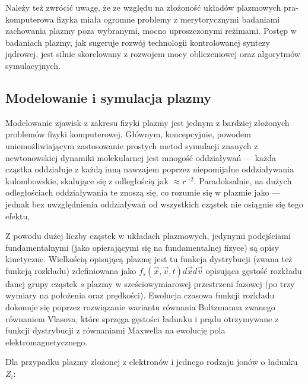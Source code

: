     Należy też zwrócić uwagę, że ze względu na złożoność układów plazmowych
    pra-komputerowa fizyka miała ogromne problemy z merytorycznymi badaniami
    zachowania plazmy poza wybranymi, mocno uproszczonymi reżimami. Postęp w
    badaniach plazmy, jak sugeruje rozwój technologii kontrolowanej syntezy
    jądrowej, jest silnie skorelowany z
    rozwojem mocy obliczeniowej oraz algorytmów symulacyjnych.\cite{youtube-plasma-algorithm-progress}

    \subsection{Modelowanie i symulacja plazmy}

    Modelowanie zjawisk z zakresu fizyki plazmy jest jednym z bardziej
    złożonych problemów fizyki komputerowej. Głównym, koncepcyjnie, powodem
    uniemożliwiającym zastosowanie prostych metod symulacji znanych z
    newtonowskiej dynamiki molekularnej jest mnogość oddziaływań --- każda
    cząstka oddziałuje z każdą inną nawzajem poprzez niepomijalne oddziaływania
    kulombowskie, skalujące się z odległością jak
    $\approx r^{-2}$. Paradoksalnie, na dużych odległościach oddziaływania
    te znoszą się, co rozumie się w plazmie jako  --- jednak
    bez uwzględnienia oddziaływań od wszystkich cząstek nie osiągnie się tego
    efektu,

    Z powodu dużej liczby cząstek w układach plazmowych, jedynymi podejściami
    fundamentalnymi (jako opierającymi się na fundamentalnej fizyce) są opisy
    kinetyczne. Wielkością opisującą plazmę jest tu funkcja dystrybucji (zwana
    też funkcją rozkładu) zdefiniowana jako $f_s(\vec{x}, \vec{v}, t) d\vec{x}
    d\vec{v}$ opisująca gęstość rozkładu danej grupy cząstek $s$ plazmy w
    sześciowymiarowej przestrzeni fazowej (po trzy wymiary na położenia oraz
    prędkości). Ewolucja czasowa funkcji rozkładu dokonuje się poprzez
    rozwiązanie wariantu równania Boltzmanna zwanego równaniem Vlasova,
    które sprzęga gęstości ładunku i prądu otrzymywane z funkcji dystrybucji
    z równaniami Maxwella na ewolucję pola elektromagnetycznego.

    Dla przypadku plazmy złożonej z elektronów i jednego rodzaju jonów o ładunku $Z_i$:

